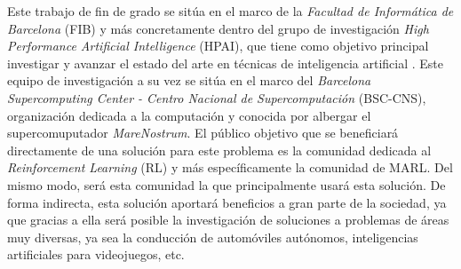 Este trabajo de fin de grado se sitúa en el marco de la \emph{Facultad de Informática de Barcelona} (FIB) y más concretamente dentro del grupo de investigación \emph{High Performance Artificial Intelligence} (HPAI), que tiene como objetivo principal investigar y avanzar el estado del arte en técnicas de inteligencia artificial \cite{hpai} \cite{bsc-hpai}. Este equipo de investigación a su vez se sitúa en el marco del \emph{Barcelona Supercomputing Center - Centro Nacional de Supercomputación} (BSC-CNS), organización dedicada a la computación y conocida por albergar el supercomuputador \emph{MareNostrum}. El público objetivo que se beneficiará directamente de una solución para este problema es la comunidad dedicada al \emph{Reinforcement Learning} (RL) y más específicamente la comunidad de MARL. Del mismo modo, será esta comunidad la que principalmente usará esta solución. De forma indirecta, esta solución aportará beneficios a gran parte de la sociedad, ya que gracias a ella será posible la investigación de soluciones a problemas de áreas muy diversas, ya sea la conducción de automóviles autónomos, inteligencias artificiales para videojuegos, etc. 




